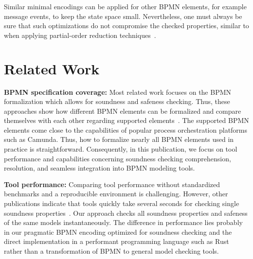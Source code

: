\documentclass[runningheads]{llncs}
\begin{document}
Similar minimal encodings can be applied for other BPMN elements, for example message events, to keep the state space small.
Nevertheless, one must always be sure that such optimizations do not compromise the checked properties, similar to when applying partial-order reduction techniques~\cite{valmariStateExplosionProblem1998}.

\section{Related Work}

\textbf{BPMN specification coverage:}
Most related work focuses on the BPMN formalization which allows for soundness and safeness checking.
Thus, these approaches show how different BPMN elements can be formalized and compare themselves with each other regarding supported elements~\cite{corradiniFormalApproachAnalysis2021,houhouFirstOrderLogicVerification2022,krauterFormalizationAnalysisBPMN2023,krauterHigherorderTransformationApproach2023}.
The supported BPMN elements come close to the capabilities of popular process orchestration platforms such as Camunda.
Thus, how to formalize nearly all BPMN elements used in practice is straightforward.
Consequently, in this publication, we focus on tool performance and capabilities concerning soundness checking comprehension, resolution, and seamless integration into BPMN modeling tools.

\textbf{Tool performance:}
Comparing tool performance without standardized benchmarks and a reproducible environment is challenging.
However, other publications indicate that tools quickly take several seconds for checking single soundness properties~\cite{corradiniFormalApproachAnalysis2021,houhouFirstOrderLogicVerification2022,krauterHigherorderTransformationApproach2023}.
Our approach checks all soundness properties and safeness of the same models instantaneously.
The difference in performance lies probably in our pragmatic BPMN encoding optimized for soundness checking and the direct implementation in a performant programming language such as Rust rather than a transformation of BPMN to general model checking tools.
\end{document}
